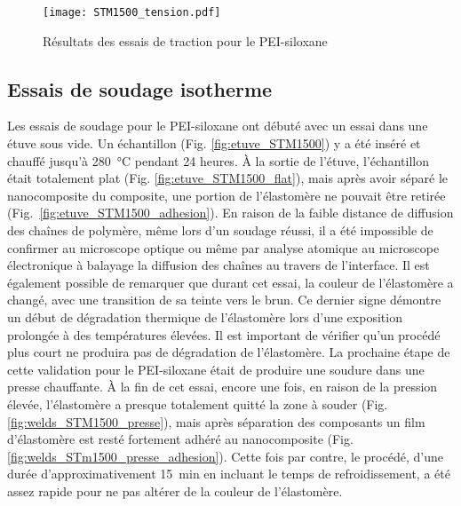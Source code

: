 \begin{figure}[h]
	\centering
	\texttt{[image: STM1500\_tension.pdf]}
	\caption{Résultats des essais de traction pour le PEI-siloxane}
	\label{fig:STM1500_tension}
\end{figure}

\FloatBarrier
\subsection{Essais de soudage isotherme}
 
Les essais de soudage pour le PEI-siloxane ont débuté avec un essai dans une étuve sous vide. 
Un échantillon (Fig. \ref{fig:etuve_STM1500}) y a été inséré et chauffé jusqu'à \SI[locale=FR]{280}{\celsius} pendant 24 heures. 
À la sortie de l'étuve, l'échantillon était totalement plat (Fig. \ref{fig:etuve_STM1500_flat}), mais après avoir séparé le nanocomposite du composite, une portion de l'élastomère ne pouvait être retirée (Fig.~\ref{fig:etuve_STM1500_adhesion}). 
En raison de la faible distance de diffusion des chaînes de polymère, même lors d'un soudage réussi, il a été impossible de confirmer au microscope optique ou même par analyse atomique au microscope électronique à balayage la diffusion des chaînes au travers de l'interface. 
Il est également possible de remarquer que durant cet essai, la couleur de l'élastomère a changé, avec une transition de sa teinte vers le brun.  
Ce dernier signe démontre un début de dégradation thermique de l'élastomère lors d'une exposition prolongée à des températures élevées. 
Il est important de vérifier qu'un procédé plus court ne produira pas de dégradation de l'élastomère. 
La prochaine étape de cette validation pour le PEI-siloxane était de produire une soudure dans une presse chauffante. 
À la fin de cet essai, encore une fois, en raison de la pression élevée, l'élastomère a presque totalement quitté la zone à souder (Fig. \ref{fig:welds_STM1500_presse}), mais après séparation des composants un film d'élastomère est resté fortement adhéré au nanocomposite (Fig. \ref{fig:welds_STm1500_presse_adhesion}). 
Cette fois par contre, le procédé, d'une durée d'approximativement \SI[locale=FR]{15}{\minute} en incluant le temps de refroidissement, a été assez rapide pour ne pas altérer de la couleur de l'élastomère. 

